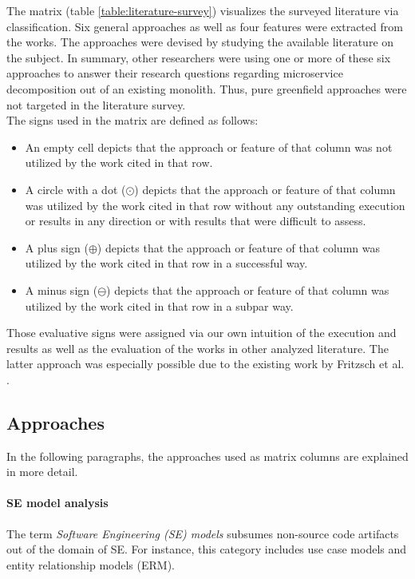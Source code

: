 \documentclass[12pt,a4paper]{report}
\begin{document}
The matrix (table \ref{table:literature-survey}) visualizes the
surveyed literature via classification.
Six general approaches as well as four features were extracted from the works.
The approaches were devised by studying the available literature on the subject.
In summary, other researchers were using one or more of these six approaches
to answer their research questions regarding microservice decomposition out of an existing monolith.
Thus, pure greenfield approaches were not targeted in the literature survey.\\
The signs used in the matrix are defined as follows:
\begin{itemize}[noitemsep]
    \item An empty cell depicts that the approach or feature of that column was not utilized
    by the work cited in that row.
    \item A circle with a dot ($\odot$) depicts that the approach or feature
    of that column was utilized by the work cited in that row without any outstanding execution
    or results in any direction or with results that were difficult to assess.
    \item A plus sign ($\oplus$) depicts that the approach or feature
    of that column was utilized by the work cited in that row in a successful way.
    \item A minus sign ($\ominus$) depicts that the approach or feature
    of that column was utilized by the work cited in that row in a subpar way.
\end{itemize}
Those evaluative signs were assigned via our own intuition of the execution and results
as well as the evaluation of the works in other analyzed literature.
The latter approach was especially possible due to
the existing work by Fritzsch et al. \cite{fritzsch2018monolith}.


\subsection*{Approaches}

In the following paragraphs, the approaches used as matrix columns are explained in more detail.
\paragraph{SE model analysis}
The term \textit{Software Engineering (SE) models} subsumes non-source code
artifacts out of the domain of SE.
For instance, this category includes use case models and entity relationship models (ERM).
\end{document}
